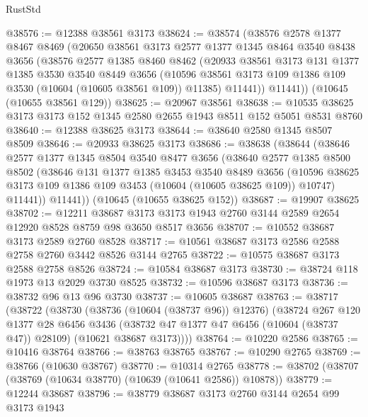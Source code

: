 \begin{lexlean}{RustStd}
\begin{coremodule}
@38576 := @12388 @38561 @3173
@38624 := @38574
    (@38576
      @2578
      @1377
      @8467
      @8469
      (@20650
        @38561
        @3173
        @2577
        @1377
        @1345
        @8464
        @3540
        @8438
        @3656
        (@38576
          @2577
          @1385
          @8460
          @8462
          (@20933
            @38561
            @3173
            @131
            @1377
            @1385
            @3530
            @3540
            @8449
            @3656
            (@10596 @38561 @3173 @109 @1386 @109 @3530 (@10604 (@10605 @38561 @109)) @11385)
            @11441))
        @11441))
    (@10645 (@10655 @38561 @129))
@38625 := @20967 @38561
@38638 := @10535 @38625 @3173 @3173 @152 @1345 @2580 @2655 @1943 @8511 @152 @5051 @8531 @8760
@38640 := @12388 @38625 @3173
@38644 := @38640 @2580 @1345 @8507 @8509
@38646 := @20933 @38625 @3173
@38686 := @38638
    (@38644
      (@38646
        @2577
        @1377
        @1345
        @8504
        @3540
        @8477
        @3656
        (@38640
          @2577
          @1385
          @8500
          @8502
          (@38646
            @131
            @1377
            @1385
            @3453
            @3540
            @8489
            @3656
            (@10596 @38625 @3173 @109 @1386 @109 @3453 (@10604 (@10605 @38625 @109)) @10747)
            @11441))
        @11441))
    (@10645 (@10655 @38625 @152))
@38687 := @19907 @38625
@38702 := @12211
    @38687
    @3173
    @3173
    @1943
    @2760
    @3144
    @2589
    @2654
    @12920
    @8528
    @8759
    @98
    @3650
    @8517
    @3656
@38707 := @10552 @38687 @3173 @2589 @2760 @8528
@38717 := @10561 @38687 @3173 @2586 @2588 @2758 @2760 @3442 @8526 @3144 @2765
@38722 := @10575 @38687 @3173 @2588 @2758 @8526
@38724 := @10584 @38687 @3173
@38730 := @38724 @118 @1973 @13 @2029 @3730 @8525
@38732 := @10596 @38687 @3173
@38736 := @38732 @96 @13 @96 @3730
@38737 := @10605 @38687
@38763 := @38717
    (@38722
      (@38730
        (@38736 (@10604 (@38737 @96)) @12376)
        (@38724
          @267
          @120
          @1377
          @28
          @6456
          @3436
          (@38732 @47 @1377 @47 @6456 (@10604 (@38737 @47)) @28109)
          (@10621 @38687 @3173))))
@38764 := @10220 @2586
@38765 := @10416 @38764
@38766 := @38763 @38765
@38767 := @10290 @2765
@38769 := @38766 (@10630 @38767)
@38770 := @10314 @2765
@38778 := @38702 (@38707 (@38769 (@10634 @38770) (@10639 (@10641 @2586)) @10878))
@38779 := @12244 @38687
@38796 := @38779
    @38687
    @3173
    @2760
    @3144
    @2654
    @99
    @3173
    @1943

\end{coremodule}
\end{lexlean}

